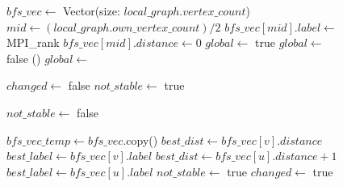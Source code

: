 \documentclass[conference]{IEEEtran}
\begin{document}
\begin{figure}  
    \begin{algorithmic}[1]  
    \State $bfs\_vec \gets$ Vector(size: $local\_graph.vertex\_count$)
    \State $mid \gets (local\_graph.own\_vertex\_count) /2$
    \State $bfs\_vec[mid].label \gets $ MPI\_rank
    \State $bfs\_vec[mid].distance \gets 0$
    \State $global \gets $ true
        \State $global \gets $ false
        \State {}()
        \State $global \gets$ 
    \EndWhile
    
    \EndProcedure  
    \end{algorithmic}

    \vspace{10pt}

    \begin{algorithmic}[1]  
    



    \vspace{10pt}


    \State $changed \gets $ false
    \State $not\_stable \gets $ true

        \State $not\_stable \gets $ false
        
        \State $bfs\_vec\_temp \gets bfs\_vec$.copy()
        \State $best\_dist \gets bfs\_vec[v].distance$
        \State $best\_label \gets bfs\_vec[v].label$ 
                \State $best\_dist \gets bfs\_vec[u].distance + 1$
                \State $best\_label \gets bfs\_vec[u].label$
                \State $not\_stable \gets $ true
                \State $changed \gets $ true


\end{algorithmic}
\end{figure}
\end{document}
